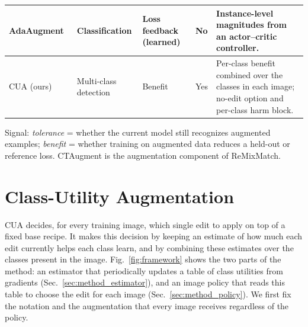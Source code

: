 \documentclass[conference]{IEEEtran}
\begin{document}
\begin{table}[t]
\begin{tabularx}{\textwidth}{@{}p{}p{}p{}p{}Y@{}}
AdaAugment~\cite{yang2025adaaugment} & Classification & Loss feedback (learned) & No & Instance-level magnitudes from an actor--critic controller. \\
\midrule
CUA (ours) & Multi-class detection & Benefit & Yes & Per-class benefit combined over the classes in each image; no-edit option and per-class harm block. \\
\bottomrule
\end{tabularx}
\vspace{3pt}
\begin{minipage}{\textwidth}
\footnotesize
Signal: \emph{tolerance} = whether the current model still recognizes augmented examples; \emph{benefit} = whether training on augmented data reduces a held-out or reference loss. CTAugment is the augmentation component of ReMixMatch.
\end{minipage}
\end{table}

\section{Class-Utility Augmentation}
\label{sec:method}

CUA decides, for every training image, which single edit to apply on top of a fixed base recipe. It makes this decision by keeping an estimate of how much each edit currently helps each class learn, and by combining these estimates over the classes present in the image. Fig.~\ref{fig:framework} shows the two parts of the method: an estimator that periodically updates a table of class utilities from gradients (Sec.~\ref{sec:method_estimator}), and an image policy that reads this table to choose the edit for each image (Sec.~\ref{sec:method_policy}). We first fix the notation and the augmentation that every image receives regardless of the policy.
\end{document}
